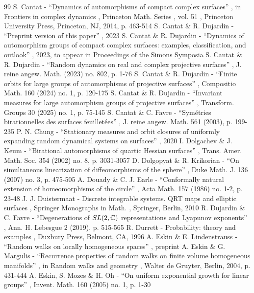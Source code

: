 \documentclass[11pt]{article}
\theoremstyle{plain}
\theoremstyle{definition}
\numberwithin{equation}{section}
\begin{document}
\begin{thebibliography}{99}
 S. Cantat - “Dynamics of automorphisms of compact complex surfaces” , in Frontiers in complex dynamics , Princeton Math. Series , vol. 51 , Princeton University Press, Princeton, NJ, 2014, p. 463-514
 S. Cantat \& R. Dujardin - “Preprint version of this paper” , 2023
 S. Cantat \& R. Dujardin - “Dynamics of automorphism groups of compact complex surfaces: examples, classification, and outlook” , 2023, to appear in Proceedings of the Simons Symposia
 S. Cantat \& R. Dujardin - “Random dynamics on real and complex projective surfaces” , J. reine angew. Math. (2023) no. 802, p. 1-76
 S. Cantat \& R. Dujardin - “Finite orbits for large groups of automorphisms of projective surfaces” , Compositio Math. 160 (2024) no. 1, p. 120-175
 S. Cantat \& R. Dujardin - “Invariant measures for large automorphism groups of projective surfaces” , Transform. Groups 30 (2025) no. 1, p. 75-145
 S. Cantat \& C. Favre - “Symétries birationnelles des surfaces feuilletées” , J. reine angew. Math. 561 (2003), p. 199-235
 P. N. Chung - “Stationary measures and orbit closures of uniformly expanding random dynamical systems on surfaces” , 2020
 I. Dolgachev \& J. Keum - “Birational automorphisms of quartic Hessian surfaces” , Trans. Amer. Math. Soc. 354 (2002) no. 8, p. 3031-3057
 D. Dolgopyat \& R. Krikorian - “On simultaneous linearization of diffeomorphisms of the sphere” , Duke Math. J. 136 (2007) no. 3, p. 475-505
 A. Douady \& C. J. Earle - “Conformally natural extension of homeomorphisms of the circle” , Acta Math. 157 (1986) no. 1-2, p. 23-48
 J. J. Duistermaat - Discrete integrable systems. QRT maps and elliptic surfaces , Springer Monographs in Math. , Springer, Berlin, 2010
 R. Dujardin \& C. Favre - “Degenerations of ${\rm SL}(2,\mathbb{C})$ representations and Lyapunov exponents” , Ann. H. Lebesgue 2 (2019), p. 515-565
 R. Durrett - Probability: theory and examples , Duxbury Press, Belmont, CA, 1996
 A. Eskin \& E. Lindenstrauss - “Random walks on locally homogeneous spaces” , preprint
 A. Eskin \& G. Margulis - “Recurrence properties of random walks on finite volume homogeneous manifolds” , in Random walks and geometry , Walter de Gruyter, Berlin, 2004, p. 431-444
 A. Eskin, S. Mozes \& H. Oh - “On uniform exponential growth for linear groups” , Invent. Math. 160 (2005) no. 1, p. 1-30

\end{thebibliography}
\end{document}

